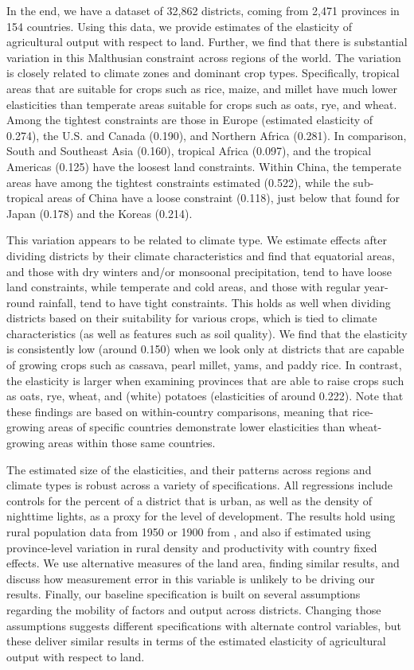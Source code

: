 \documentclass[11pt]{article}
\begin{document}
In the end, we have a dataset of 32,862 districts, coming from 2,471 provinces in 154 countries. Using this data, we provide estimates of the elasticity of agricultural output with respect to land. Further, we find that there is substantial variation in this Malthusian constraint across regions of the world. The variation is closely related to climate zones and dominant crop types. Specifically, tropical areas that are suitable for crops such as rice, maize, and millet have much lower elasticities than temperate areas suitable for crops such as oats, rye, and wheat. Among the tightest constraints are those in Europe (estimated elasticity of 0.274), the U.S. and Canada (0.190), and Northern Africa (0.281). In comparison, South and Southeast Asia (0.160), tropical Africa (0.097), and the tropical Americas (0.125) have the loosest land constraints. Within China, the temperate areas have among the tightest constraints estimated (0.522), while the sub-tropical areas of China have a loose constraint (0.118), just below that found for Japan (0.178) and the Koreas (0.214). 

This variation appears to be related to climate type. We estimate effects after dividing districts by their climate characteristics and find that equatorial areas, and those with dry winters and/or monsoonal precipitation, tend to have loose land constraints, while temperate and cold areas, and those with regular year-round rainfall, tend to have tight constraints. This holds as well when dividing districts based on their suitability for various crops, which is tied to climate characteristics (as well as features such as soil quality). We find that the elasticity is consistently low (around 0.150) when we look only at districts that are capable of growing crops such as cassava, pearl millet, yams, and paddy rice. In contrast, the elasticity is larger when examining provinces that are able to raise crops such as oats, rye, wheat, and (white) potatoes (elasticities of around 0.222). Note that these findings are based on within-country comparisons, meaning that rice-growing areas of specific countries demonstrate lower elasticities than wheat-growing areas within those same countries.

The estimated size of the elasticities, and their patterns across regions and climate types is robust across a variety of specifications. All regressions include controls for the percent of a district that is urban, as well as the density of nighttime lights, as a proxy for the level of development. The results hold using rural population data from 1950 or 1900 from \cite{hyde31}, and also if estimated using province-level variation in rural density and productivity with country fixed effects. We use alternative measures of the land area, finding similar results, and discuss how measurement error in this variable is unlikely to be driving our results. Finally, our baseline specification is built on several assumptions regarding the mobility of factors and output across districts. Changing those assumptions suggests different specifications with alternate control variables, but these deliver similar results in terms of the estimated elasticity of agricultural output with respect to land.
\end{document}
